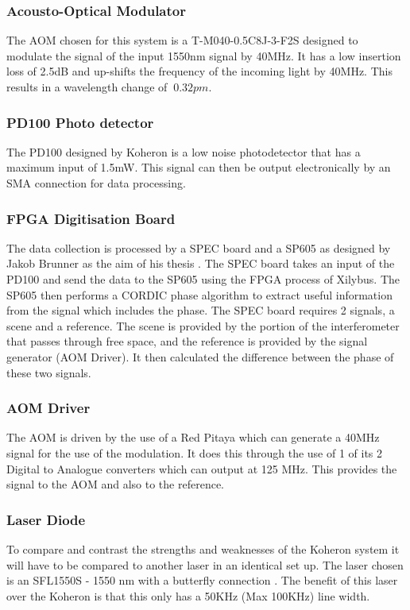 \documentclass[12pt,a4paper,oneside]{report}
\begin{document}
\subsubsection{Acousto-Optical Modulator}
The AOM \cite{Sell1550MODULATOR} chosen for this system is a  T-M040-0.5C8J-3-F2S designed to modulate the signal of the input 1550nm signal by 40MHz. It has a low insertion loss of 2.5dB and up-shifts the frequency of the incoming light by 40MHz. This results in a wavelength change of $~0.32pm$.

\subsubsection{PD100 Photo detector}
The PD100 designed by Koheron \cite{KoheronPD100Photodetector} is a low noise photodetector that has a maximum input of 1.5mW. This signal can then be output electronically by an SMA connection for data processing.

\subsubsection{FPGA Digitisation Board}
The data collection is processed by a SPEC board and a SP605 as designed by Jakob Brunner as the aim of his thesis \cite{Brunner2017}. The SPEC board takes an input of the PD100 and send the data to the SP605 using the FPGA process of Xilybus. The SP605 then performs a CORDIC phase algorithm to extract useful information from the signal which includes the phase. The SPEC board requires 2 signals, a scene and a reference. The scene is provided by the portion of the interferometer that passes through free space, and the reference is provided by the signal generator (AOM Driver). It then calculated the difference between the phase of these two signals.

\subsubsection{AOM Driver}
The AOM is driven by the use of a Red Pitaya \cite{Leban2014RedManual} which can generate a 40MHz signal for the use of the modulation. It does this through the use of 1 of its 2 Digital to Analogue converters which can output at 125 MHz. This provides the signal to the AOM and also to the reference.

\subsubsection{Laser Diode}
To compare and contrast the strengths and weaknesses of the Koheron system it will have to be compared to another laser in an identical set up. The laser chosen is an SFL1550S - 1550 nm with a butterfly connection \cite{ThorlabsFC/APC}. The benefit of this laser over the Koheron is that this only has a 50KHz (Max 100KHz) line width.
\end{document}
